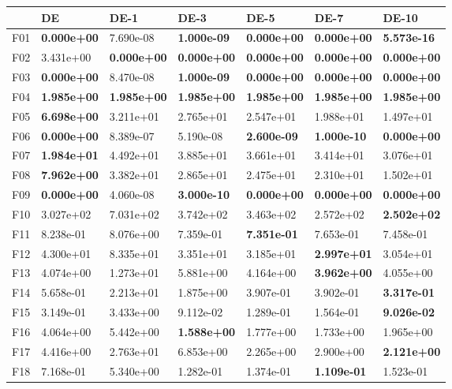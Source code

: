 \begin{tabular}{lllllll}
\toprule
{} & DE & DE-1 & DE-3 & DE-5 & DE-7 & DE-10 \\
\midrule
F01 & \textbf{0.000e+00} & 7.690e-08 & \textbf{1.000e-09} & \textbf{0.000e+00} & \textbf{0.000e+00} & \textbf{5.573e-16} \\
F02 & 3.431e+00 & \textbf{0.000e+00} & \textbf{0.000e+00} & \textbf{0.000e+00} & \textbf{0.000e+00} & \textbf{0.000e+00} \\
F03 & \textbf{0.000e+00} & 8.470e-08 & \textbf{1.000e-09} & \textbf{0.000e+00} & \textbf{0.000e+00} & \textbf{0.000e+00} \\
F04 & \textbf{1.985e+00} & \textbf{1.985e+00} & \textbf{1.985e+00} & \textbf{1.985e+00} & \textbf{1.985e+00} & \textbf{1.985e+00} \\
F05 & \textbf{6.698e+00} & 3.211e+01 & 2.765e+01 & 2.547e+01 & 1.988e+01 & 1.497e+01 \\
F06 & \textbf{0.000e+00} & 8.389e-07 & 5.190e-08 & \textbf{2.600e-09} & \textbf{1.000e-10} & \textbf{0.000e+00} \\
F07 & \textbf{1.984e+01} & 4.492e+01 & 3.885e+01 & 3.661e+01 & 3.414e+01 & 3.076e+01 \\
F08 & \textbf{7.962e+00} & 3.382e+01 & 2.865e+01 & 2.475e+01 & 2.310e+01 & 1.502e+01 \\
F09 & \textbf{0.000e+00} & 4.060e-08 & \textbf{3.000e-10} & \textbf{0.000e+00} & \textbf{0.000e+00} & \textbf{0.000e+00} \\
F10 & 3.027e+02 & 7.031e+02 & 3.742e+02 & 3.463e+02 & 2.572e+02 & \textbf{2.502e+02} \\
F11 & 8.238e-01 & 8.076e+00 & 7.359e-01 & \textbf{7.351e-01} & 7.653e-01 & 7.458e-01 \\
F12 & 4.300e+01 & 8.335e+01 & 3.351e+01 & 3.185e+01 & \textbf{2.997e+01} & 3.054e+01 \\
F13 & 4.074e+00 & 1.273e+01 & 5.881e+00 & 4.164e+00 & \textbf{3.962e+00} & 4.055e+00 \\
F14 & 5.658e-01 & 2.213e+01 & 1.875e+00 & 3.907e-01 & 3.902e-01 & \textbf{3.317e-01} \\
F15 & 3.149e-01 & 3.433e+00 & 9.112e-02 & 1.289e-01 & 1.564e-01 & \textbf{9.026e-02} \\
F16 & 4.064e+00 & 5.442e+00 & \textbf{1.588e+00} & 1.777e+00 & 1.733e+00 & 1.965e+00 \\
F17 & 4.416e+00 & 2.763e+01 & 6.853e+00 & 2.265e+00 & 2.900e+00 & \textbf{2.121e+00} \\
F18 & 7.168e-01 & 5.340e+00 & 1.282e-01 & 1.374e-01 & \textbf{1.109e-01} & 1.523e-01 \\

\end{tabular}

